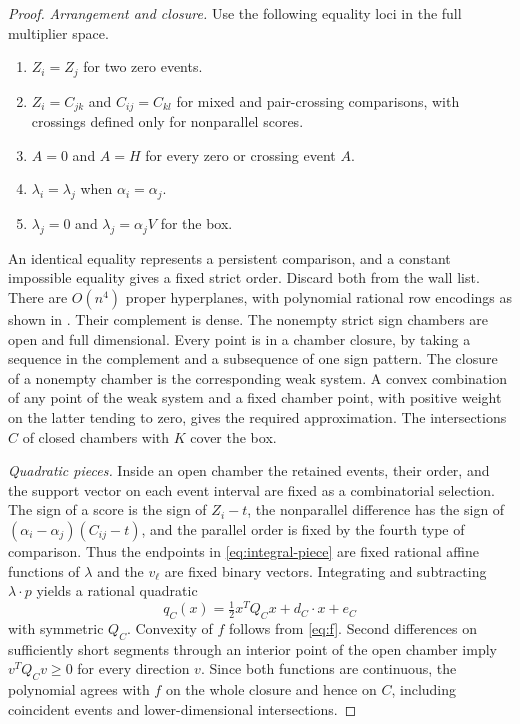 \begin{proof}
\emph{Arrangement and closure.}
Use the following equality loci in the full multiplier space.
\begin{enumerate}
 \item $Z_i=Z_j$ for two zero events.
 \item $Z_i=C_{jk}$ and $C_{ij}=C_{kl}$ for mixed and pair-crossing comparisons, with crossings defined only for nonparallel scores.
 \item $A=0$ and $A=H$ for every zero or crossing event $A$.
 \item $\lambda_i=\lambda_j$ when $\alpha_i=\alpha_j$.
 \item $\lambda_j=0$ and $\lambda_j=\alpha_jV$ for the box.
\end{enumerate}
An identical equality represents a persistent comparison, and a constant impossible equality gives a fixed strict order. Discard both from the wall list. There are $O(n^4)$ proper hyperplanes, with polynomial rational row encodings as shown in . Their complement is dense. The nonempty strict sign chambers are open and full dimensional. Every point is in a chamber closure, by taking a sequence in the complement and a subsequence of one sign pattern. The closure of a nonempty chamber is the corresponding weak system. A convex combination of any point of the weak system and a fixed chamber point, with positive weight on the latter tending to zero, gives the required approximation. The intersections $C$ of closed chambers with $K$ cover the box.

\emph{Quadratic pieces.}
Inside an open chamber the retained events, their order, and the support vector on each event interval are fixed as a combinatorial selection. The sign of a score is the sign of $Z_i-t$, the nonparallel difference has the sign of $(\alpha_i-\alpha_j)(C_{ij}-t)$, and the parallel order is fixed by the fourth type of comparison. Thus the endpoints in \eqref{eq:integral-piece} are fixed rational affine functions of $\lambda$ and the $v_\ell$ are fixed binary vectors. Integrating and subtracting $\lambda\cdot p$ yields a rational quadratic
\[
 q_C(x)=\tfrac12 x^TQ_Cx+d_C\cdot x+e_C
\]
with symmetric $Q_C$. Convexity of $f$ follows from \eqref{eq:f}. Second differences on sufficiently short segments through an interior point of the open chamber imply $v^TQ_Cv\geq0$ for every direction $v$. Since both functions are continuous, the polynomial agrees with $f$ on the whole closure and hence on $C$, including coincident events and lower-dimensional intersections.


\end{proof}
